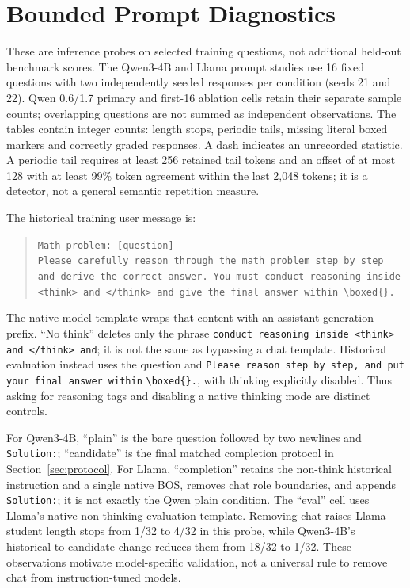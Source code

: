 \section{Bounded Prompt Diagnostics}
\label{app:probes}
These are inference probes on selected training questions, not additional held-out benchmark scores. The Qwen3-4B and Llama prompt studies use 16 fixed questions with two independently seeded responses per condition (seeds 21 and 22). Qwen 0.6/1.7 primary and first-16 ablation cells retain their separate sample counts; overlapping questions are not summed as independent observations. The tables contain integer counts: length stops, periodic tails, missing literal boxed markers and correctly graded responses. A dash indicates an unrecorded statistic. A periodic tail requires at least 256 retained tail tokens and an offset of at most 128 with at least 99\% token agreement within the last 2,048 tokens; it is a detector, not a general semantic repetition measure.

The historical training user message is:
\begin{quote}\small
\texttt{Math problem: [question]}\\
\texttt{Please carefully reason through the math problem step by step and derive the correct answer. You must conduct reasoning inside <think> and </think> and give the final answer within}\ \verb|\boxed{}.|\
\end{quote}
The native model template wraps that content with an assistant generation prefix. ``No think'' deletes only the phrase \texttt{conduct reasoning inside <think> and </think> and}; it is not the same as bypassing a chat template. Historical evaluation instead uses the question and \texttt{Please reason step by step, and put your final answer within} \verb|\boxed{}.|, with thinking explicitly disabled. Thus asking for reasoning tags and disabling a native thinking mode are distinct controls.

For Qwen3-4B, ``plain'' is the bare question followed by two newlines and \texttt{Solution:}; ``candidate'' is the final matched completion protocol in Section~\ref{sec:protocol}. For Llama, ``completion'' retains the non-think historical instruction and a single native BOS, removes chat role boundaries, and appends \texttt{Solution:}; it is not exactly the Qwen plain condition. The ``eval'' cell uses Llama's native non-thinking evaluation template. Removing chat raises Llama student length stops from 1/32 to 4/32 in this probe, while Qwen3-4B's historical-to-candidate change reduces them from 18/32 to 1/32. These observations motivate model-specific validation, not a universal rule to remove chat from instruction-tuned models.


